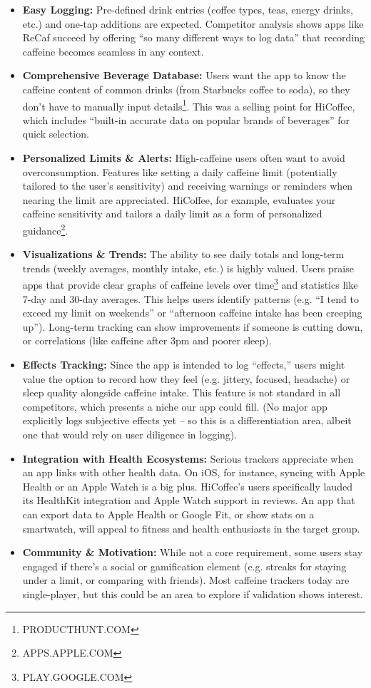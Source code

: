 \documentclass{article}
\begin{document}
\begin{itemize}
    \item \textbf{Easy Logging:} Pre-defined drink entries (coffee types, teas, energy drinks, etc.) and one-tap additions are expected. Competitor analysis shows apps like ReCaf succeed by offering “so many different ways to log data” that recording caffeine becomes seamless in any context\footnotemark[2].
    \item \textbf{Comprehensive Beverage Database:} Users want the app to know the caffeine content of common drinks (from Starbucks coffee to soda), so they don’t have to manually input details\footnote{PRODUCTHUNT.COM}. This was a selling point for HiCoffee, which includes “built-in accurate data on popular brands of beverages” for quick selection\footnotemark[3].
    \item \textbf{Personalized Limits \& Alerts:} High-caffeine users often want to avoid overconsumption. Features like setting a daily caffeine limit (potentially tailored to the user’s sensitivity) and receiving warnings or reminders when nearing the limit are appreciated. HiCoffee, for example, evaluates your caffeine sensitivity and tailors a daily limit as a form of personalized guidance\footnote{APPS.APPLE.COM}.
    \item \textbf{Visualizations \& Trends:} The ability to see daily totals and long-term trends (weekly averages, monthly intake, etc.) is highly valued. Users praise apps that provide clear graphs of caffeine levels over time\footnote{PLAY.GOOGLE.COM} and statistics like 7-day and 30-day averages\footnotemark[2]. This helps users identify patterns (e.g. “I tend to exceed my limit on weekends” or “afternoon caffeine intake has been creeping up”). Long-term tracking can show improvements if someone is cutting down, or correlations (like caffeine after 3pm and poorer sleep).
    \item \textbf{Effects Tracking:} Since the app is intended to log “effects,” users might value the option to record how they feel (e.g. jittery, focused, headache) or sleep quality alongside caffeine intake. This feature is not standard in all competitors, which presents a niche our app could fill. (No major app explicitly logs subjective effects yet – so this is a differentiation area, albeit one that would rely on user diligence in logging).
    \item \textbf{Integration with Health Ecosystems:} Serious trackers appreciate when an app links with other health data. On iOS, for instance, syncing with Apple Health or an Apple Watch is a big plus. HiCoffee’s users specifically lauded its HealthKit integration and Apple Watch support in reviews\footnotemark[3, 4]. An app that can export data to Apple Health or Google Fit, or show stats on a smartwatch, will appeal to fitness and health enthusiasts in the target group.
    \item \textbf{Community \& Motivation:} While not a core requirement, some users stay engaged if there’s a social or gamification element (e.g. streaks for staying under a limit, or comparing with friends). Most caffeine trackers today are single-player, but this could be an area to explore if validation shows interest.
\end{itemize}
\end{document}
